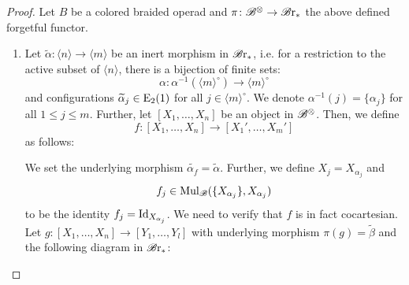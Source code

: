 \begin{proof}
    Let $B$ be a colored braided operad and $\pi \colon \mathscr{B}^{\otimes} \to \mathscr{B} \text{r}_{\ast}$ the above
    defined forgetful functor.
    \begin{enumerate}
        \item Let $\widetilde{\alpha} \colon \langle n \rangle \to  \langle m
        \rangle$ be an inert morphism in $\mathscr{B} \text{r}_{\ast}$, i.e. for a restriction to the
        active subset of $\langle n \rangle$, there is a bijection of finite
        sets:
        \[
            \alpha \colon \alpha^{-1}(\langle m \rangle^{\circ}) \to \langle m \rangle^{\circ}
        \]
        and configurations $\widetilde{\alpha}_j \in \operatorname{E}_2(1)$ for all $j \in
        \langle m \rangle^{\circ}$. We denote $\alpha^{-1}(j) = \{\alpha_j\}$
        for all $1 \leq j \leq m$. Further, let $[X_1, \dots, X_n]$ be an object
        in $\mathscr{B}^{\otimes}$. Then, we define
        \[
            f \colon [X_1, \dots, X_n] \to [X_1', \dots, X_m']
        \]
        as follows:

        We set the underlying morphism $\widetilde{\alpha_f} =
        \widetilde{\alpha}$. Further, we define $X_j = X_{\alpha_j}$ and
        \[
            f_j \in \operatorname{Mul}_{\mathscr{B}}(\{X_{\alpha_j}\},X_{\alpha_j})
        \]
        to be the identity $f_j = \operatorname{Id}_{X_{\alpha_j}}$. We need to verify that
        $f$ is in fact cocartesian. Let $g \colon [X_1, \dots, X_n] \to [Y_1,
        \dots, Y_l]$ with underlying morphism $\pi(g) = \widetilde{\beta}$ and
        the following diagram in $\mathscr{B} \text{r}_{\ast}$:
            \begin{center}
\end{center}
\end{enumerate}
\end{proof}
